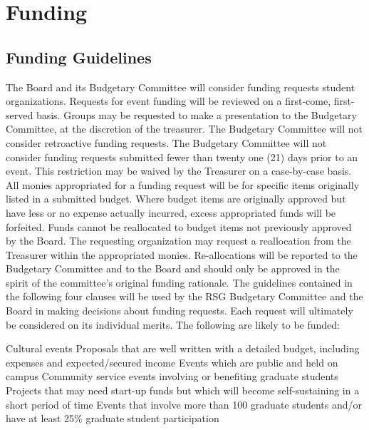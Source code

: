 \chapter{Funding}
\section{Funding Guidelines}\label{sec:fun_guid}
\begin{enumsubsection}
\itemnotoc The Board and its Budgetary Committee will consider funding requests 
student organizations. Requests for event funding will be reviewed on 
a first-come, first-served basis. Groups may be requested to make a 
presentation to the Budgetary Committee, at the discretion of the 
treasurer.
\itemnotoc The Budgetary Committee will not consider retroactive funding 
requests.
\itemnotoc \label{sec:bud_timeline}The Budgetary Committee will not consider funding requests 
submitted fewer than twenty one (21) days prior to an event. This 
restriction may be waived by the Treasurer on a case-by-case basis. 
\itemnotoc \label{sec:bud_realloc}All monies appropriated for a funding request will be for specific items 
originally listed in a submitted budget. Where budget items are 
originally approved but have less or no expense actually incurred, 
excess appropriated funds will be forfeited. Funds cannot be 
reallocated to budget items not previously approved by the Board. The 
requesting organization may request a reallocation from the Treasurer 
within the appropriated monies. Re-allocations will be reported to the 
Budgetary Committee and to the Board and should only be approved 
in the spirit of the committee's original funding rationale.
\itemnotoc The guidelines contained in the following four clauses will be used by 
the RSG Budgetary Committee and the Board in making decisions 
about funding requests. Each request will ultimately be considered on 
its individual merits. 
\itemnotoc The following are likely to be funded: 
\begin{enumsubsubsection}
\itemnotoc Cultural events 
\itemnotoc Proposals that are well written with a detailed budget, including 
expenses and expected/secured income 
\itemnotoc Events which are public and held on campus 
\itemnotoc Community service events involving or benefiting graduate students 
\itemnotoc Projects that may need start-up funds but which will become self-sustaining in a short period of time 
\itemnotoc Events that involve more than 100 graduate students and/or have 
at least 25\% graduate student participation 

\end{enumsubsubsection}
\end{enumsubsection}
